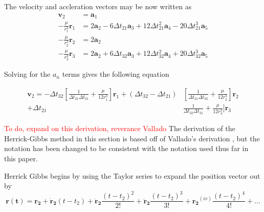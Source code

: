 \documentclass[12pt]{article}
\begin{document}
	The velocity and accleration vectors may be now written as
	 \begin{equation}
	 \begin{aligned} \mathbf { v } _ { 2 } & = \mathbf { a } _ { 1 } \\ - \frac { \mu } { r _ { 1 } ^ { 3 } } \mathbf { r } _ { 1 } & = 2 \mathbf { a } _ { 2 } - 6 \Delta t _ { 21 } \mathbf { a } _ { 3 } + 12 \Delta t _ { 21 } ^ { 2 } \mathbf { a } _ { 4 } - 20 \Delta t _ { 21 } ^ { 3 } \mathbf { a } _ { 5 } \\ - \frac { \mu } { r _ { 2 } ^ { 3 } } \mathbf { r } _ { 2 } & = 2 \mathbf { a } _ { 2 } \\ - \frac { \mu } { r _ { 3 } ^ { 3 } } \mathbf { r } _ { 3 } & = 2 \mathbf { a } _ { 2 } + 6 \Delta t _ { 32 } \mathbf { a } _ { 3 } + 12 \Delta t _ { 32 } ^ { 2 } \mathbf { a } _ { 4 } + 20 \Delta t _ { 32 } ^ { 3 } \mathbf { a } _ { 5 } \end{aligned}
	 \end{equation}
	
	Solving for the $a_n$ terms gives the following equation
	
	\begin{equation}
	\begin{aligned} \mathbf { v } _ { 2 } = - \Delta t _ { 32 } \left[ \frac { 1 } { \Delta t _ { 21 } \Delta t _ { 31 } } + \frac { \mu } { 12 r _ { 1 } ^ { 3 } } \right] \mathbf { r } _ { 1 } + \left( \Delta t _ { 32 } - \Delta t _ { 21 } \right) & \left[ \frac { 1 } { \Delta t _ { 21 } \Delta t _ { 32 } } + \frac { \mu } { 12 r _ { 2 } ^ { 3 } } \right] \mathbf { r } _ { 2 } \\ + \Delta t _ { 21 } & \frac { 1 } { \Delta t _ { 32 } \Delta t _ { 31 } } + \frac { \mu } { 12 r _ { 3 } ^ { 3 } } ] \mathbf { r } _ { 3 } \end{aligned}
	\end{equation}
	
	\textcolor{red}{To do, expand on this derivation, reverance Vallado}
	\iffalse
	The derivation of the Herrick-Gibbs method in this section is based off of Vallado's derivation \cite{vallado2007fundamentals}, but the notation has been changed to be consistent with the notation used thus far in this paper. 
	
		Herrick Gibbs begins by using the Taylor series to expand the position vector out by 
		\begin{equation}
		\mathbf{r(t)}=\mathbf{r_2}+\mathbf{\dot{r}_2} (t-t_2) + \mathbf{\ddot{r}_2} \frac{(t-t_2)^2}{2!}+ \mathbf{\dddot{r}_2} \frac{(t-t_2)^3}{3!}+ \mathbf{{r_2}}^{(iv)} \frac{(t-t_2)^4}{4!}+\dots
		\end{equation}
		
\end{document}
